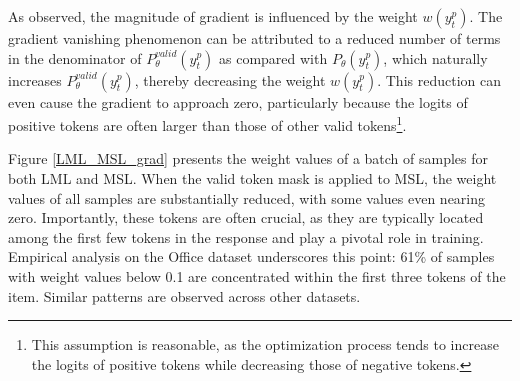 \documentclass[sigconf,natbib=true]{acmart}
\begin{document}
As observed, the magnitude of gradient is influenced by the weight $w(y_t^p)$. The gradient vanishing phenomenon can be attributed to a reduced number of terms in the denominator of \(P_\theta^{valid}(y_t^p)\) as compared with \(P_\theta(y_t^p)\), which naturally increases \(P_\theta^{valid}(y_t^p)\), thereby decreasing the weight \(w(y_t^p)\). This reduction can even cause the gradient to approach zero, particularly because the logits of positive tokens are often larger than those of other valid tokens\footnote{This assumption is reasonable, as the optimization process tends to increase the logits of positive tokens while decreasing those of negative tokens.}.

Figure \ref{LML_MSL_grad} presents the weight values of a batch of samples for both LML and MSL. When the valid token mask is applied to MSL, the weight values of all samples are substantially reduced, with some values even nearing zero. 
Importantly, these tokens are often crucial, as they are typically located among the first few tokens in the response and play a pivotal role in training. 
Empirical analysis on the Office dataset underscores this point: 61\% of samples with weight values below 0.1 are concentrated within the first three tokens of the item. Similar patterns are observed across other datasets.



\end{document}
